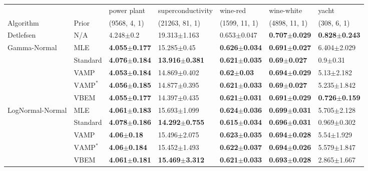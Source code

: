 \begin{tabular}{lllllll}
\midrule
                 &      &               power plant &          superconductivity &                  wine-red &                wine-white &                     yacht \\
Algorithm & Prior& (9568, 4, 1)& (21263, 81, 1)& (1599, 11, 1)& (4898, 11, 1)& (308, 6, 1)\\
\midrule
Detlefsen & N/A &             4.248$\pm$0.2 &           19.313$\pm$1.163 &           0.653$\pm$0.047 &  \textbf{0.707$\pm$0.029} &  \textbf{0.828$\pm$0.243} \\
Gamma-Normal & MLE &  \textbf{4.055$\pm$0.177} &            15.285$\pm$0.45 &  \textbf{0.626$\pm$0.034} &  \textbf{0.691$\pm$0.027} &           6.404$\pm$2.029 \\
                 & Standard &  \textbf{4.076$\pm$0.184} &  \textbf{13.916$\pm$0.381} &  \textbf{0.621$\pm$0.035} &   \textbf{0.69$\pm$0.027} &              0.9$\pm$0.31 \\
                 & VAMP &  \textbf{4.053$\pm$0.184} &           14.869$\pm$0.402 &    \textbf{0.62$\pm$0.03} &  \textbf{0.694$\pm$0.029} &            5.13$\pm$2.182 \\
                 & $\text{VAMP}^*$ &  \textbf{4.056$\pm$0.185} &           14.877$\pm$0.395 &  \textbf{0.621$\pm$0.033} &   \textbf{0.69$\pm$0.027} &           5.235$\pm$1.842 \\
                 & VBEM &  \textbf{4.055$\pm$0.177} &           14.397$\pm$0.435 &  \textbf{0.621$\pm$0.031} &  \textbf{0.691$\pm$0.029} &  \textbf{0.726$\pm$0.159} \\
LogNormal-Normal & MLE &  \textbf{4.061$\pm$0.183} &           15.693$\pm$1.099 &  \textbf{0.624$\pm$0.036} &  \textbf{0.699$\pm$0.031} &           5.705$\pm$2.128 \\
                 & Standard &  \textbf{4.078$\pm$0.186} &  \textbf{14.292$\pm$0.755} &  \textbf{0.615$\pm$0.034} &  \textbf{0.696$\pm$0.031} &           0.969$\pm$0.302 \\
                 & VAMP &    \textbf{4.06$\pm$0.18} &           15.496$\pm$2.075 &  \textbf{0.623$\pm$0.035} &  \textbf{0.694$\pm$0.028} &            5.54$\pm$1.929 \\
                 & $\text{VAMP}^*$ &   \textbf{4.06$\pm$0.184} &           15.452$\pm$1.493 &  \textbf{0.622$\pm$0.037} &  \textbf{0.694$\pm$0.026} &           5.579$\pm$1.847 \\
                 & VBEM &  \textbf{4.061$\pm$0.181} &  \textbf{15.469$\pm$3.312} &  \textbf{0.621$\pm$0.033} &  \textbf{0.693$\pm$0.028} &           2.865$\pm$1.667 \\
\bottomrule
\end{tabular}

